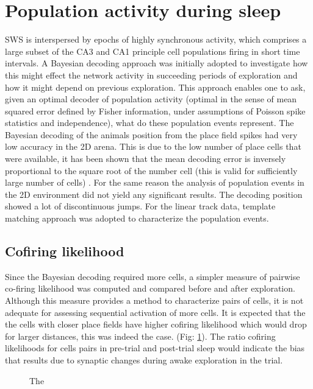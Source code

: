 \section{Population activity during sleep}

SWS is interspersed by epochs of highly synchronous activity, which comprises a large subset of the CA3 and CA1 principle cell populations firing in short time intervals. A Bayesian decoding approach was initially adopted to investigate how this might effect the network activity in succeeding periods of exploration and how it might depend on previous exploration. This approach enables one to ask, given an optimal decoder of population activity (optimal in the sense of mean squared error defined by Fisher information, under assumptions of Poisson spike statistics  and independence), what do these population events represent. The Bayesian decoding of the animals position from the place field spikes had very low accuracy in the 2D arena. This is due to the low number of place cells that were available, it has been shown that the mean decoding error is inversely proportional to the square root of the number cell (this is valid for sufficiently large number of cells) \cite{Zhang2013}. For the same reason the analysis of population events in the 2D environment did not yield any significant results. The decoding position showed a lot of discontinuous jumps. For the linear track data, template matching approach was adopted to characterize the population events. 

\subsection{Cofiring likelihood}
Since the Bayesian decoding required more cells, a simpler measure of pairwise co-firing likelihood was computed and compared before and after exploration. Although this measure provides a method to characterize pairs of cells, it is not adequate for assessing sequential activation of more cells. It is expected that the the cells with closer place fields have higher cofiring likelihood which would drop for larger distances, this was indeed the case. (Fig: \ref{fig:cfvsdist}). The ratio cofiring likelihoods for cells pairs in pre-trial and post-trial sleep would indicate the bias that results due to synaptic changes during awake exploration in the trial.
\begin{figure}[htb!]
\centering
{}
\caption[Pairwise cofiring]{The }
\label{fig:cfvsdist}
\end{figure}

